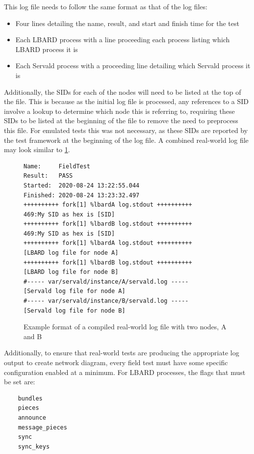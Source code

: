 This log file needs to follow the same format as that of the log files:
\begin{itemize}
    \item Four lines detailing the name, result, and start and finish time for the test
    \item Each LBARD process with a line proceeding each process listing which LBARD process it is
    \item Each Servald process with a proceeding line detailing which Servald process it is
\end{itemize} 

Additionally, the SIDs for each of the nodes will need to be listed at the top of the file. 
This is because as the initial log file is processed, any references to a SID involve a lookup to determine which node this is referring to, requiring these SIDs to be listed at the beginning of the file to remove the need to preprocess this file.
For emulated tests this was not necessary, as these SIDs are reported by the test framework at the beginning of the log file.
A combined real-world log file may look similar to \figurename{ \ref{fig:chapter6RealWorldLog}}.

\begin{figure}
    \begin{centering}
\begin{lstlisting}[basicstyle=\small, breaklines, frame=single]
Name:     FieldTest
Result:   PASS
Started:  2020-08-24 13:22:55.044
Finished: 2020-08-24 13:23:32.497
++++++++++ fork[1] %lbardA log.stdout ++++++++++
469:My SID as hex is [SID]
++++++++++ fork[1] %lbardB log.stdout ++++++++++
469:My SID as hex is [SID]
++++++++++ fork[1] %lbardA log.stdout ++++++++++
[LBARD log file for node A]
++++++++++ fork[1] %lbardB log.stdout ++++++++++
[LBARD log file for node B]
#----- var/servald/instance/A/servald.log -----
[Servald log file for node A]
#----- var/servald/instance/B/servald.log -----
[Servald log file for node B]
\end{lstlisting}
        \caption{Example format of a compiled real-world log file with two nodes, A and B}
        \label{fig:chapter6RealWorldLog}
    \end{centering}
\end{figure}

Additionally, to ensure that real-world tests are producing the appropriate log output to create network diagram, every field test must have some specific configuration enabled at a minimum.
For LBARD processes, the flags that must be set are:
\begin{lstlisting}
    bundles
    pieces
    announce
    message_pieces
    sync
    sync_keys
    \end{lstlisting}

